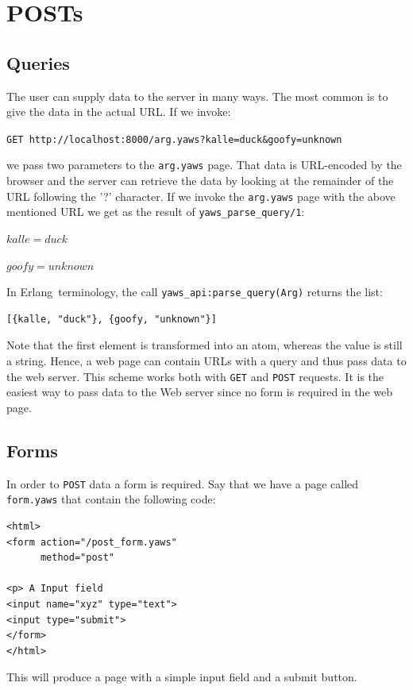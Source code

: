 \documentclass[11pt,oneside,english]{book}
\newcommand{\Erlang}            %
        {{\sc Erlang}}
\begin{document}
\section{POSTs}

\subsection{Queries}

The user can supply data to the server in many ways. The most
common is to give the data in the actual URL.
If we invoke:

\verb+GET http://localhost:8000/arg.yaws?kalle=duck&goofy=unknown+

we pass two parameters to the \verb+arg.yaws+ page.  That data is
URL-encoded by the browser and the server can retrieve the data by
looking at the remainder of the URL following the '?' character.  If
we invoke the \verb+arg.yaws+ page with the above mentioned URL we get
as the result of \verb+yaws_parse_query/1+:

$kalle = duck$

$goofy = unknown$

In \Erlang\  terminology, the call \verb+yaws_api:parse_query(Arg)+ returns
the list:
\begin{verbatim}
[{kalle, "duck"}, {goofy, "unknown"}]
\end{verbatim}

Note that the first element is transformed into an atom, whereas the
value is still a string. Hence, a web page can contain URLs with a
query and thus pass data to the web server. This scheme works both
with \verb+GET+ and \verb+POST+ requests.  It is the easiest way to
pass data to the Web server since no form is required in the web page.


\subsection{Forms}

In order to \verb+POST+ data a form is required. Say that we have a
page called \verb+form.yaws+ that contain the following code:

\begin{verbatim}
<html>
<form action="/post_form.yaws"
      method="post"

<p> A Input field
<input name="xyz" type="text">
<input type="submit">
</form>
</html>
\end{verbatim}

This will produce a page with a simple input field and a submit button.
\end{document}
